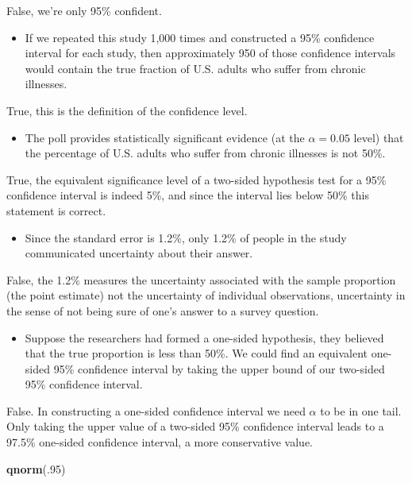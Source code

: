 \documentclass[
]{book}
\newenvironment{Shaded}{\begin{snugshade}}{\end{snugshade}}
\newcommand{\DecValTok}[1]{\textcolor[rgb]{0.00,0.00,0.81}{#1}}
\newcommand{\KeywordTok}[1]{\textcolor[rgb]{0.13,0.29,0.53}{\textbf{#1}}}
\newcommand{\NormalTok}[1]{#1}
\providecommand{\tightlist}{%
  \setlength{\itemsep}{0pt}\setlength{\parskip}{0pt}}
\begin{document}
False, we're only 95\% confident.

\begin{itemize}
\tightlist
\item
  If we repeated this study 1,000 times and constructed a 95\% confidence interval for each study, then approximately 950 of those confidence intervals would contain the true fraction of U.S. adults who suffer from chronic illnesses.
\end{itemize}

True, this is the definition of the confidence level.

\begin{itemize}
\tightlist
\item
  The poll provides statistically significant evidence (at the \(\alpha = 0.05\) level) that the percentage of U.S. adults who suffer from chronic illnesses is not 50\%.
\end{itemize}

True, the equivalent significance level of a two-sided hypothesis test for a 95\% confidence interval is indeed 5\%, and since the interval lies below 50\% this statement is correct.

\begin{itemize}
\tightlist
\item
  Since the standard error is 1.2\%, only 1.2\% of people in the study communicated uncertainty about their answer.
\end{itemize}

False, the 1.2\% measures the uncertainty associated with the sample proportion (the point estimate) not the uncertainty of individual observations, uncertainty in the sense of not being sure of one's answer to a survey question.

\begin{itemize}
\tightlist
\item
  Suppose the researchers had formed a one-sided hypothesis, they believed that the true proportion is less than 50\%. We could find an equivalent one-sided 95\% confidence interval by taking the upper bound of our two-sided 95\% confidence interval.
\end{itemize}

False. In constructing a one-sided confidence interval we need \(\alpha\) to be in one tail. Only taking the upper value of a two-sided 95\% confidence interval leads to a 97.5\% one-sided confidence interval, a more conservative value.

\begin{Shaded}
\begin{Highlighting}[]
\KeywordTok{qnorm}\NormalTok{(.}\DecValTok{95}\NormalTok{)}
\end{Highlighting}
\end{Shaded}
\end{document}
